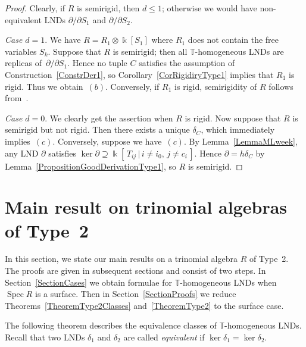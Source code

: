 \documentclass[a4paper,reqno,12pt]{amsart}
\theoremstyle{plain}
\theoremstyle{definition}
\theoremstyle{plain}
\theoremstyle{remark}
\DeclareMathOperator{\Spec}{Spec}
\newcommand{\TT}{\mathbb{T}}
\newcommand{\kk}{\Bbbk}
\begin{document}
\begin{proof}
      Clearly, if $R$ is semirigid, then $d\le1$; otherwise we would have non-equivalent LNDs ${\partial/\partial S_1}$ and ${\partial/\partial S_2}$.
    
    \emph{Case $d=1$}. We have $R=R_1\otimes\kk[S_1]$ where $R_1$ does not contain the free variables $S_k$.  Suppose that $R$ is semirigid; then all ${\TT}$-homogeneous LNDs are replicas of~${\partial/\partial S_1}$. Hence no tuple $C$ satisfies the assumption of Construction~\ref{ConstrDer1}, so Corollary~\ref{CorRigidiryType1} implies that $R_1$ is rigid. Thus we obtain~$(b)$.
    Conversely, if $R_1$ is rigid, semirigidity of $R$ follows from~\cite[Theorem~2.24]{Freu}.
    
    \emph{Case $d=0$}. We clearly get the assertion when $R$ is rigid. Now suppose that $R$ is semirigid but not rigid. Then there exists a unique $\delta_C$, which immediately implies~$(c)$. Conversely, suppose we have~$(c)$. By Lemma~\ref{LemmaMLweek}, any LND $\partial$ satisfies $\ker\partial\supseteq\kk[\,T_{ij}\,|\,i\neq i_0, \,j\neq c_i\,]$. Hence $\partial=h\delta_C$ by Lemma~\ref{PropositionGoodDerivationType1}, so $R$ is semirigid.
\end{proof}

\section{Main result on trinomial algebras of Type~2}
In this section, we state our main results on a trinomial algebra $R$ of Type~2. The proofs are given in subsequent sections and consist of two steps. In Section~\ref{SectionCases} we obtain formulae for ${\TT}$-homogeneous LNDs when $\Spec R$ is a surface. Then in Section~\ref{SectionProofs} we reduce Theorems~\ref{TheoremType2Classes} and~\ref{TheoremType2} to the surface case.

The following theorem describes the equivalence classes of ${\TT}$-homogeneous LNDs. Recall that two LNDs $\delta_1$ and $\delta_2$ are called \emph{equivalent} if $\ker\delta_1=\ker\delta_2$.
\end{document}

